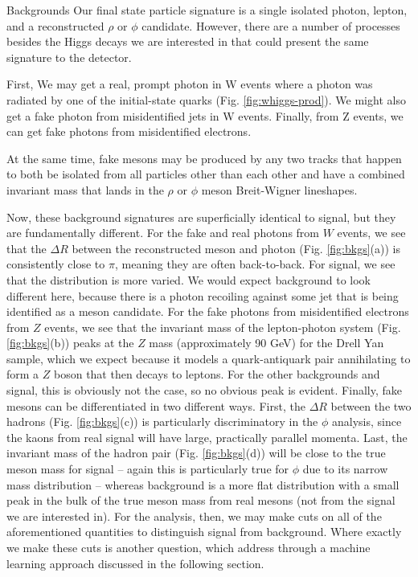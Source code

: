 \begin{section}{Backgrounds}\label{backgrounds}
Our final state particle signature is a single isolated photon, lepton, and a reconstructed $\rho$ or $\phi$ candidate. However, there are a number of processes besides the Higgs decays we are interested in that could present the same signature to the detector.

First, We may get a real, prompt photon in W events where a photon was radiated by one of the initial-state quarks (Fig. \ref{fig:whiggs-prod}). We might also get a fake photon from misidentified jets in W events. Finally, from Z events, we can get fake photons from misidentified electrons.

At the same time, fake mesons may be produced by any two tracks that happen to both be isolated from all particles other than each other and have a combined invariant mass that lands in the $\rho$ or $\phi$ meson Breit-Wigner lineshapes.

Now, these background signatures are superficially identical to signal, but they are fundamentally different. For the fake and real photons from $W$ events, we see that the $\Delta R$ between the reconstructed meson and photon (Fig. \ref{fig:bkgs}(a)) is consistently close to $\pi$, meaning they are often back-to-back. For signal, we see that the distribution is more varied. We would expect background to look different here, because there is a photon recoiling against some jet that is being identified as a meson candidate. For the fake photons from misidentified electrons from $Z$ events, we see that the invariant mass of the lepton-photon system (Fig. \ref{fig:bkgs}(b)) peaks at the $Z$ mass (approximately 90 GeV) for the Drell Yan sample, which we expect because it models a quark-antiquark pair annihilating to form a $Z$ boson that then decays to leptons. For the other backgrounds and signal, this is obviously not the case, so no obvious peak is evident. Finally, fake mesons can be differentiated in two different ways. First, the $\Delta R$ between the two hadrons (Fig. \ref{fig:bkgs}(c)) is particularly discriminatory in the $\phi$ analysis, since the kaons from real signal will have large, practically parallel momenta. Last, the invariant mass of the hadron pair (Fig. \ref{fig:bkgs}(d)) will be close to the true meson mass for signal -- again this is particularly true for $\phi$ due to its narrow mass distribution -- whereas background is a more flat distribution with a small peak in the bulk of the true meson mass from real mesons (not from the signal we are interested in). For the analysis, then, we may make cuts on all of the aforementioned quantities to distinguish signal from background. Where exactly we make these cuts is another question, which address through a machine learning approach discussed in the following section.


\end{section}
